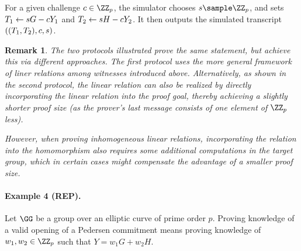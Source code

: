 \documentclass[runningheads,11pt]{article}
\newtheorem{remark}{Remark}
\begin{document}
For a given challenge $c\in\ZZ_p$, the simulator chooses $s\sample\ZZ_p$, and sets $T_1\gets sG-cY_1$ and $T_2\gets sH - cY_2$.
It then outputs the simulated transcript $((T_1,T_2),c,s)$.


\begin{remark}
  The two protocols illustrated prove the same statement, but achieve this via different approaches.
  The first protocol uses the more general framework of liner relations among witnesses introduced above.
  Alternatively, as shown in the second protocol, the linear relation can also be realized by  directly incorporating the linear relation into the proof goal, thereby achieving a slightly shorter proof size (as the prover's last message consists of one element of $\ZZ_p$ less).

  However, when proving inhomogeneous linear relations, incorporating the relation into the homomorphism also requires some additional computations in the target group, which in certain cases might compensate the advantage of a smaller proof size.
\end{remark}


\paragraph{Example 4 (REP).}
Let $\GG$ be a group over an elliptic curve of prime order $p$.
Proving knowledge of a valid opening of a Pedersen commitment means proving knowledge of $w_1,w_2\in\ZZ_p$ such that $Y=w_1G + w_2H$.
\end{document}

